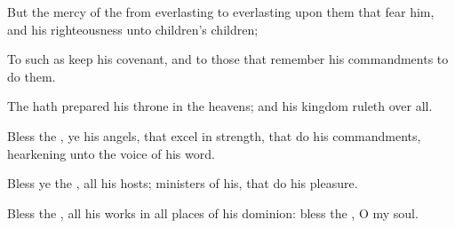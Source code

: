 {\par }{\Q {}But the
mercy of the
{}
{} from
everlasting
to
everlasting upon them that
fear him, and his
righteousness unto
children’s
children;
\par }{\Q {}To such as
keep his
covenant, and to those that
remember his
commandments to
do them.
\par }{\BB \par }{\Q {}The
{} hath
prepared his
throne in the
heavens; and his
kingdom
ruleth over all.
\par }{\Q {}Bless the
{}, ye his
angels, that
excel in
strength, that
do his
commandments,
hearkening unto the
voice of his
word.
\par }{\Q {}Bless ye the
{}, all
{} his
hosts;
{}
ministers of his, that
do his
pleasure.
\par }{\Q {}Bless the
{}, all his
works in all
places of his
dominion:
bless the
{}, O my
soul.

}
